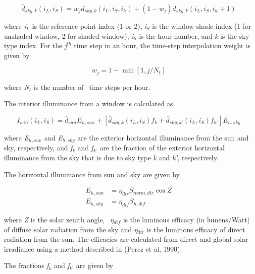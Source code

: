 \begin{equation}
{\bar d_{sky,k}}({i_L},{i_S}) = {w_j}{d_{sky,k}}({i_L},{i_S},{i_h}) + (1 - {w_j}){d_{sky,k}}({i_L},{i_S},{i_h} + 1)
\end{equation}

where \emph{i\(_{L}\)} is the reference point index (1 or 2), \emph{i\(_{S}\)} is the window shade index (1 for unshaded window, 2 for shaded window), \emph{i\(_{h}\)} is the hour number, and \emph{k} is the sky type index. For the \emph{j\(^{th}\)} time step in an hour, the time-step interpolation weight is given by

\begin{equation}
{w_j} = 1 - \min [1,j/{N_t}]
\end{equation}

where \emph{N\(_{t}\)} is the number of~ time steps per hour.

The interior illuminance from a window is calculated as

\begin{equation}
{I_{win}}({i_L},{i_S}) = {\bar d_{sun}}{E_{h,sun}} + [{\bar d_{sky,k}}({i_L},{i_S}){f_k} + {\bar d_{sky,k'}}({i_L},{i_S}){f_{k'}}]{E_{h,sky}}
\end{equation}

where \emph{E\(_{h,sun}\)} and \emph{E\(_{h,sky}\)} are the exterior horizontal illuminance from the sun and sky, respectively, and \emph{f\(_{k}\)} and \emph{f\(_{k’}\)} are the fraction of the exterior horizontal illuminance from the sky that is due to sky type \emph{k} and \emph{k'}, respectively.

The horizontal illuminance from sun and sky are given by

\begin{equation}
  \begin{array}{rl}
    E_{h,sun} & = \eta_{dir} S_{norm,dir} \cos Z \\
    E_{h,sky} & = \eta_{dif} S_{h,dif}
  \end{array}
\end{equation}

where \emph{Z} is the solar zenith angle,~ \emph{$\eta$\(_{dif}\)} is the luminous efficacy (in lumens/Watt) of diffuse solar radiation from the sky and \emph{$\eta$\(_{dir}\)} is the luminous efficacy of direct radiation from the sun. The efficacies are calculated from direct and global solar irradiance using a method described in (Perez et al, 1990).

The fractions \emph{f\(_{k}\)} and \emph{f\(_{k’}\)} are given by

